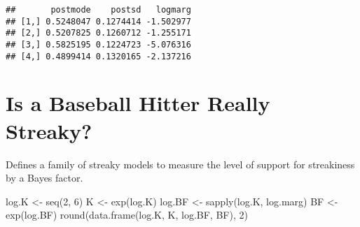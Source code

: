 \documentclass[
]{book}
\newenvironment{Shaded}{\begin{snugshade}}{\end{snugshade}}
\newcommand{\AttributeTok}[1]{\textcolor[rgb]{0.77,0.63,0.00}{#1}}
\newcommand{\ControlFlowTok}[1]{\textcolor[rgb]{0.13,0.29,0.53}{\textbf{#1}}}
\newcommand{\DecValTok}[1]{\textcolor[rgb]{0.00,0.00,0.81}{#1}}
\newcommand{\FunctionTok}[1]{\textcolor[rgb]{0.00,0.00,0.00}{#1}}
\newcommand{\NormalTok}[1]{#1}
\newcommand{\OtherTok}[1]{\textcolor[rgb]{0.56,0.35,0.01}{#1}}
\newcommand{\SpecialCharTok}[1]{\textcolor[rgb]{0.00,0.00,0.00}{#1}}
\begin{document}
\begin{verbatim}
##       postmode    postsd   logmarg
## [1,] 0.5248047 0.1274414 -1.502977
## [2,] 0.5207825 0.1260712 -1.255171
## [3,] 0.5825195 0.1224723 -5.076316
## [4,] 0.4899414 0.1320165 -2.137216
\end{verbatim}

\hypertarget{is-a-baseball-hitter-really-streaky}{%
\section{Is a Baseball Hitter Really Streaky?}\label{is-a-baseball-hitter-really-streaky}}

Defines a family of streaky models to measure the level of support for streakiness by a Bayes factor.

\begin{Shaded}
\end{Shaded}

\begin{Shaded}
\end{Shaded}

\begin{Shaded}
\begin{Highlighting}[]
\NormalTok{log.K }\OtherTok{\textless{}{-}} \FunctionTok{seq}\NormalTok{(}\DecValTok{2}\NormalTok{, }\DecValTok{6}\NormalTok{)}
\NormalTok{K }\OtherTok{\textless{}{-}} \FunctionTok{exp}\NormalTok{(log.K)}
\NormalTok{log.BF }\OtherTok{\textless{}{-}} \FunctionTok{sapply}\NormalTok{(log.K, log.marg)}
\NormalTok{BF }\OtherTok{\textless{}{-}} \FunctionTok{exp}\NormalTok{(log.BF)}
\FunctionTok{round}\NormalTok{(}\FunctionTok{data.frame}\NormalTok{(log.K, K, log.BF, BF), }\DecValTok{2}\NormalTok{)}
\end{Highlighting}
\end{Shaded}
\end{document}
